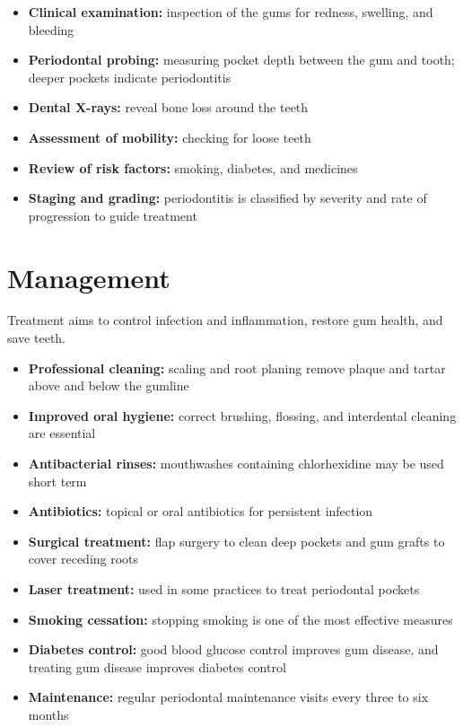 \begin{itemize}
    \item \textbf{Clinical examination:} inspection of the gums for redness, swelling, and bleeding
    \item \textbf{Periodontal probing:} measuring pocket depth between the gum and tooth; deeper pockets indicate periodontitis
    \item \textbf{Dental X-rays:} reveal bone loss around the teeth
    \item \textbf{Assessment of mobility:} checking for loose teeth
    \item \textbf{Review of risk factors:} smoking, diabetes, and medicines
    \item \textbf{Staging and grading:} periodontitis is classified by severity and rate of progression to guide treatment
\end{itemize}

\section*{Management}
Treatment aims to control infection and inflammation, restore gum health, and save teeth.

\begin{itemize}
    \item \textbf{Professional cleaning:} scaling and root planing remove plaque and tartar above and below the gumline
    \item \textbf{Improved oral hygiene:} correct brushing, flossing, and interdental cleaning are essential
    \item \textbf{Antibacterial rinses:} mouthwashes containing chlorhexidine may be used short term
    \item \textbf{Antibiotics:} topical or oral antibiotics for persistent infection
    \item \textbf{Surgical treatment:} flap surgery to clean deep pockets and gum grafts to cover receding roots
    \item \textbf{Laser treatment:} used in some practices to treat periodontal pockets
    \item \textbf{Smoking cessation:} stopping smoking is one of the most effective measures
    \item \textbf{Diabetes control:} good blood glucose control improves gum disease, and treating gum disease improves diabetes control
    \item \textbf{Maintenance:} regular periodontal maintenance visits every three to six months
\end{itemize}

